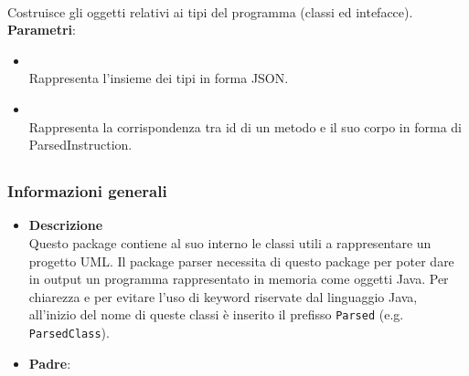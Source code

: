 \begin{itemize}
\begin{itemize}
\\ Costruisce gli oggetti relativi ai tipi del programma (classi ed intefacce).
\\ \textbf{Parametri}:
\begin{itemize}
\item {}
\\ Rappresenta l'insieme dei tipi in forma JSON.
\item {}
\\ Rappresenta la corrispondenza tra id di un metodo e il suo corpo in forma di ParsedInstruction.
\end{itemize}
\end{itemize}
\end{itemize}
\subsection{}
\label{\nogloxy{swedesigner::server::project}}
\subsubsection{Informazioni generali}
\begin{itemize}
\item \textbf{Descrizione}\\
Questo package contiene al suo interno le classi utili a rappresentare un progetto UML. Il package parser necessita di questo package per poter dare in output un programma rappresentato in memoria come oggetti Java. Per chiarezza e per evitare l'uso di keyword riservate dal linguaggio Java, all'inizio del nome di queste classi è inserito il prefisso \texttt{Parsed} (e.g. \texttt{ParsedClass}).
\item \textbf{Padre}: \hyperref[\nogloxy{swedesigner::server}]{}
\end{itemize}
